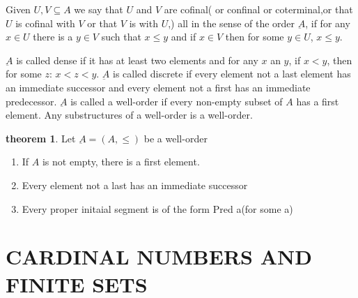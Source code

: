 \documentclass[a4paper,11pt]{article}%
\theoremstyle{remark}
\theoremstyle{definition}
\newtheorem{theorem}{theorem}[section]
\theoremstyle{definition}
\theoremstyle{plain}
\theoremstyle{definition}
\begin{document}
Given $U,V\subseteq A$ we say that $U$ and $V$ are cofinal( or confinal or coterminal,or that
$U$ is cofinal with $V$ or that $V$ is with $U$,) all in the sense of the order $\underbar{A}$,
if for any $x\in U$ there is a $y\in V$ such that $x\leq y$ and if $x\in V$
then for some $y\in U$, $x\leq y$.

$\underbar{A}$ is called dense if it has at least two elements and for any
$x$ an $y$, if $x<y$, then for some $z$: $x<z<y$. $\underbar{A}$ is called discrete
if every element not a last element has an immediate successor and every element not a first
has an immediate predecessor. $\underbar{A}$ is called a well-order if every non-empty subset of 
$A$ has a first element. Any substructures of a well-order is a well-order.
\begin{theorem}
    Let $\underbar{A}=(A,\leq)$ be a well-order 
    \begin{enumerate}
        \item If $A$ is not empty, there is a first element.
        \item Every element not a last has an immediate successor
        \item Every proper initaial segment is of the form Pred a(for some a)
    \end{enumerate}
\end{theorem}
\section{CARDINAL NUMBERS AND FINITE SETS}
\end{document}
